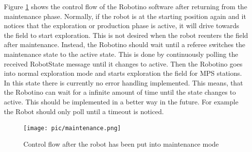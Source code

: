 \newpage


Figure \ref{fig:maintenance} shows the control flow of the Robotino software after returning from the maintenance phase. Normally, if the robot is at the starting position again and it notices that the exploration or production phase is active, it will drive towards the field to start exploration. This is not desired when the robot reenters the field after maintenance. Instead, the Robotino should wait until a referee switches the maintenance state to the active state. This is done by continuously polling the received RobotState message until it changes to active. Then the Robotino goes into normal exploration mode and starts exploration the field for MPS stations. In this state there is currently no error handling implemented. This means, that the Robotino can wait for a infinite amount of time until the state changes to active. This should be implemented in a better way in the future. For example the Robot should only poll until a timeout is noticed. \\


\begin{figure}[h]
\centering
\texttt{[image: pic/maintenance.png]}
\caption{Control flow after the robot has been put into maintenance mode}
\label{fig:maintenance}
\end{figure}


\newpage

